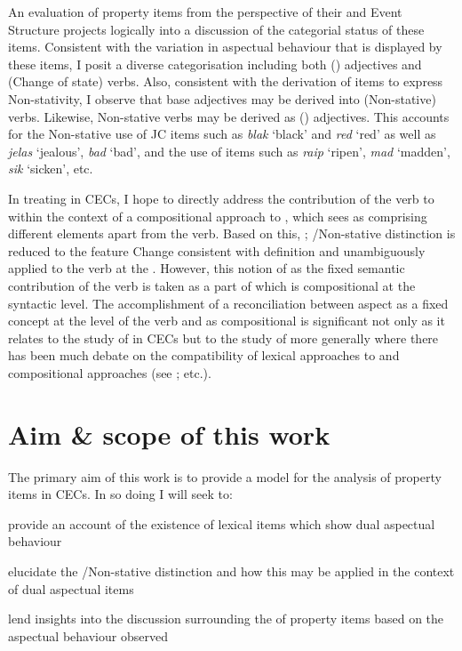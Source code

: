 An evaluation of property items from the perspective of their 
and Event Structure projects logically into a discussion of the categorial
status of these items.  Consistent with the variation in aspectual behaviour
that is displayed by these items, I posit a diverse categorisation including
both () adjectives and (Change of state) verbs.  Also, consistent with
the derivation of  items to express Non-stativity, I observe that base
adjectives may be derived into (Non-stative) verbs.  Likewise, Non-stative verbs
may be derived as () adjectives.  This accounts for the Non-stative use
of JC items such as \textit{blak} `black' and \textit{red} `red' as well as
\textit{jelas} `jealous', \textit{bad} `bad', and the  use of items such
as \textit{raip} `ripen', \textit{mad} `madden', \textit{sik} `sicken', etc.

In treating  in CECs, I hope to directly address the
contribution of the verb to  within the context of a compositional
approach to , which sees  as comprising different elements apart
from the verb.  Based on this, ; \slash Non-stative
distinction is reduced to the feature Change consistent with
 definition and unambiguously applied to the verb at the
.  However, this notion of  as the fixed semantic
contribution of the verb is taken as a part of  which is compositional at
the syntactic level.  The accomplishment of a reconciliation between aspect as a
fixed concept at the level of the verb and  as compositional is
significant not only as it relates to the study of  in CECs but to the
study of  more generally where there has been much debate on the
compatibility of lexical approaches to  and compositional approaches (see
\citealt{Rothstein2004,Tenny1994,Verkuyl1999}; etc.).

\section{Aim \& scope of this work}\label{sec:1.8}

The primary aim of this work is to provide a model for the analysis of property
items in CECs.  In so doing I will seek to:

\ea\label{ex:1:10}
  \ea\parbox[t]{\linewidth}{provide an account of the existence of lexical items which show dual
  aspectual behaviour}
  \ex\parbox[t]{\linewidth}{elucidate the \slash Non-stative distinction and how this may be applied
  in the context of dual aspectual items}
  \ex\parbox[t]{\linewidth}{lend insights into the discussion surrounding the  of
  property items based on the aspectual behaviour observed}
  \z
\z

